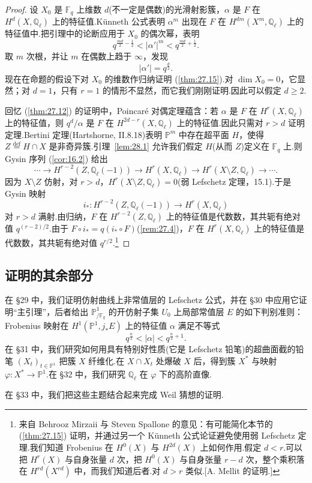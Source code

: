 \begin{proof}
设 $X_0$ 是 $\mathbb{F}_q$ 上维数 $d$(不一定是偶数)的光滑射影簇，$\alpha$ 是 $F$ 在 $H^{d}(X, \mathbb{Q}_{\ell})$ 上的特征值.K\"unneth 公式表明 $\alpha^{m}$ 出现在 $F$ 在 $H^{dm}(X^{m}, \mathbb{Q}_{\ell})$ 上的特征值中.把引理中的论断应用于 $X_0$ 的偶次幂，表明
\[
q^{\frac{md}{2} - \frac{1}{2}} < |\alpha'|^{m} < q^{\frac{md}{2} + \frac{1}{2}}.
\]
取 $m$ 次根，并让 $m$ 在偶数上趋于 $\infty$，发现
\[
|\alpha'| = q^{\frac{d}{2}}.
\]
现在在命题的假设下对 $X_0$ 的维数作归纳证明 (\ref{thm:27.15}).对 $\dim X_0 = 0$，它显然；对 $d = 1$，只有 $r = 1$ 的情形不显然，而它我们刚刚证明.因此可以假定 $d \geq 2$.

回忆 (\ref{thm:27.12}) 的证明中，Poincar\'e 对偶定理蕴含：若 $\alpha$ 是 $F$ 在 $H^{r}(X, \mathbb{Q}_{\ell})$ 上的特征值，则 $q^{d}/\alpha$ 是 $F$ 在 $H^{2d-r}(X, \mathbb{Q}_{\ell})$ 上的特征值.因此只需对 $r > d$ 证明定理.Bertini 定理(Hartshorne, II.8.18)表明 $\mathbb{P}^{m}$ 中存在超平面 $H$，使得 $Z \overset{\mathrm{def}}{=} H \cap X$ 是非奇异簇.引理~\ref{lem:28.1} 允许我们假定 $H$(从而 $Z$)定义在 $\mathbb{F}_q$ 上.则 Gysin 序列 (\ref{cor:16.2}) 给出
\[
\cdots \to H^{r-2}(Z, \mathbb{Q}_{\ell}(-1)) \to H^{r}(X, \mathbb{Q}_{\ell}) \to H^{r}(X \setminus Z, \mathbb{Q}_{\ell}) \to \cdots.
\]
因为 $X \setminus Z$ 仿射，对 $r > d$，$H^{r}(X \setminus Z, \mathbb{Q}_{\ell}) = 0$(弱 Lefschetz 定理，15.1).于是 Gysin 映射
\[
i_{*} \colon H^{r-2}(Z, \mathbb{Q}_{\ell}(-1)) \to H^{r}(X, \mathbb{Q}_{\ell})
\]
对 $r > d$ 满射.由归纳，$F$ 在 $H^{r-2}(Z, \mathbb{Q}_{\ell})$ 上的特征值是代数数，其共轭有绝对值 $q^{(r-2)/2}$.由于 $F \circ i_{*} = q(i_{*} \circ F)$(\ref{rem:27.4})，$F$ 在 $H^{r}(X, \mathbb{Q}_{\ell})$ 上的特征值是代数数，其共轭有绝对值 $q^{r/2}$.\footnote{来自 Behrooz Mirzaii 与 Steven Spallone 的意见：有可能简化本节的 (\ref{thm:27.15}) 证明，并通过另一个 K\"unneth 公式论证避免使用弱 Lefschetz 定理.我们知道 Frobenius 在 $H^{0}(X)$ 与 $H^{2d}(X)$ 上如何作用.假定 $d < r$.可以把 $H^{r}(X)$ 与自身张量 $d$ 次，把 $H^{0}(X)$ 与自身张量 $r - d$ 次，整个乘积落在 $H^{rd}(X^{rd})$ 中，而我们知道后者.对 $d > r$ 类似.[A. Mellit 的证明.]}
\end{proof}

\subsection*{证明的其余部分}

在 \S 29 中，我们证明仿射曲线上非常值层的 Lefschetz 公式，并在 \S 30 中应用它证明``主引理''，后者给出 $\mathbb{P}^{1}_{/\mathbb{F}_q}$ 的开仿射子集 $U_0$ 上局部常值层 $E$ 的如下判别准则：Frobenius 映射在 $H^{1}(\mathbb{P}^{1}, j_{*}E)$ 上的特征值 $\alpha$ 满足不等式
\[
q^{\frac{n}{2}} < |\alpha| < q^{\frac{n}{2}+1}.
\]
在 \S 31 中，我们研究如何用具有特别好性质(它是 Lefschetz 铅笔)的超曲面截的铅笔 $(X_t)_{t \in \mathbb{P}^{1}}$ 把簇 $X$ 纤维化.在 $X \cap X_t$ 处爆破 $X$ 后，得到簇 $X^{*}$ 与映射 $\varphi \colon X^{*} \to \mathbb{P}^{1}$.在 \S 32 中，我们研究 $\mathbb{Q}_{\ell}$ 在 $\varphi$ 下的高阶直像.

在 \S 33 中，我们把这些主题结合起来完成 Weil 猜想的证明.
